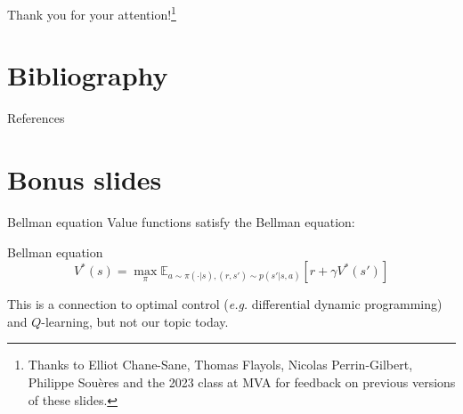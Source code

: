 \documentclass[10pt, aspectratio=1610]{beamer}
\begin{document}
\begin{frame}[standout]
    Thank you for your attention!\footnote{\color{white} Thanks to Elliot Chane-Sane, Thomas Flayols, Nicolas Perrin-Gilbert, Philippe Sou\`{e}res and the 2023 class at MVA for feedback on previous versions of these slides.}
\end{frame}

\section*{Bibliography}

\renewcommand*{\bibfont}{\footnotesize}
\begin{frame}[allowframebreaks]{References}
    \printbibliography[heading=none]
\end{frame}

\section{Bonus slides}

\begin{frame}{Bellman equation}
    Value functions satisfy the Bellman equation:
    \begin{block}{Bellman equation}
        \[
            V^*(s) = \max_\pi \mathbb{E}_{a \sim \pi(\cdot | s), (r, s') \sim p(s' | s, a)}[r + \gamma V^*(s')]
        \]
    \end{block}
    This is a connection to optimal control (\emph{e.g.} differential dynamic programming) and $Q$-learning, but not our topic today.
\end{frame}
\end{document}
